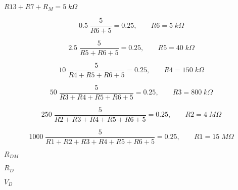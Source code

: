 {\newpage\clearpage
{}%
$R13+R7+R_M=5\;k\Omega$%
\lthtmlinlinemathZ
\lthtmlcheckvsize\clearpage}

{\newpage\clearpage
{}%
\begin{displaymath}
    0.5\;\frac{5}{R6+5}=0.25,\;\;\;\;\;\;\;R6=5\;k\Omega
    \end{displaymath}%
\lthtmldisplayZ
\lthtmlcheckvsize\clearpage}

{\newpage\clearpage
{}%
\begin{displaymath}
    2.5\;\frac{5}{R5+R6+5}=0.25,\;\;\;\;\;\;\;R5=40\;k\Omega
    \end{displaymath}%
\lthtmldisplayZ
\lthtmlcheckvsize\clearpage}

{\newpage\clearpage
{}%
\begin{displaymath}
    10\;\frac{5}{R4+R5+R6+5}=0.25,\;\;\;\;\;\;\;R4=150\;k\Omega
    \end{displaymath}%
\lthtmldisplayZ
\lthtmlcheckvsize\clearpage}

{\newpage\clearpage
{}%
\begin{displaymath}
    50\;\frac{5}{R3+R4+R5+R6+5}=0.25,\;\;\;\;\;\;\;R3=800\;k\Omega
    \end{displaymath}%
\lthtmldisplayZ
\lthtmlcheckvsize\clearpage}

{\newpage\clearpage
{}%
\begin{displaymath}
    250\;\frac{5}{R2+R3+R4+R5+R6+5}=0.25,\;\;\;\;\;\;\;R2=4\;M\Omega
    \end{displaymath}%
\lthtmldisplayZ
\lthtmlcheckvsize\clearpage}

{\newpage\clearpage
{}%
\begin{displaymath}
    1000\;\frac{5}{R1+R2+R3+R4+R5+R6+5}=0.25,\;\;\;\;\;\;\;R1=15\;M\Omega
    \end{displaymath}%
\lthtmldisplayZ
\lthtmlcheckvsize\clearpage}

{\newpage\clearpage
{}%
$R_{DM}$%
\lthtmlinlinemathZ
\lthtmlcheckvsize\clearpage}

{\newpage\clearpage
{}%
$R_D$%
\lthtmlinlinemathZ
\lthtmlcheckvsize\clearpage}

{\newpage\clearpage
{}%
$V_D$%
\lthtmlinlinemathZ
\lthtmlcheckvsize\clearpage}

